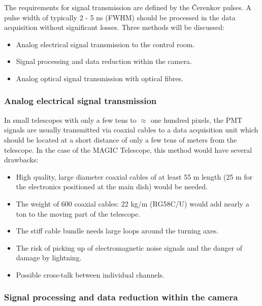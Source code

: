 The requirements for signal transmission are defined by the \v{C}erenkov
pulses. A pulse width of typically 2 - 5 ns (FWHM) should be processed in
the data acquisition without significant losses. Three methods will be
discussed:

\begin{itemize}
\item  Analog electrical signal transmission to the control room.

\item  Signal processing and data reduction within the camera.

\item  Analog optical signal transmission with optical fibres.
\end{itemize}

\subsubsection{Analog electrical signal transmission}

\medskip In small telescopes 
with only a few tens to $\approx$ one hundred pixels,
the PMT signals are usually transmitted via coaxial cables to a data
acquisition unit which should be located at a short distance of only a few
tens of meters from the telescope. In the case of the MAGIC Telescope, this method would have
several drawbacks:

\begin{itemize}
\item  High quality, large diameter coaxial cables of at least 55 m length (25
m for the electronics positioned at the main dish) would be needed.

\item  The weight of 600 coaxial cables: 22 kg/m (RG58C/U) would add nearly
a ton to the moving part of the telescope.

\item  The stiff cable bundle needs large loops around the turning axes.

\item  The risk of picking up of electromagnetic noise signals and the
danger of damage by lightning.

\item  Possible cross-talk between individual channels.
\end{itemize}

\subsubsection{Signal processing and data reduction within the camera}

